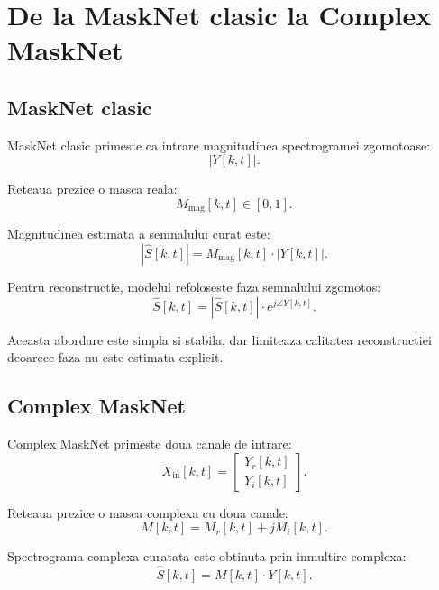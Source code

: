 \documentclass[12pt,a4paper]{article}
\begin{document}
\section{De la MaskNet clasic la Complex MaskNet}

\subsection{MaskNet clasic}

MaskNet clasic primeste ca intrare magnitudinea spectrogramei zgomotoase:
\begin{equation}
    |Y[k,t]|.
\end{equation}

Reteaua prezice o masca reala:
\begin{equation}
    M_{\mathrm{mag}}[k,t] \in [0,1].
\end{equation}

Magnitudinea estimata a semnalului curat este:
\begin{equation}
    |\hat{S}[k,t]| = M_{\mathrm{mag}}[k,t] \cdot |Y[k,t]|.
\end{equation}

Pentru reconstructie, modelul refoloseste faza semnalului zgomotos:
\begin{equation}
    \hat{S}[k,t] =
    |\hat{S}[k,t]| \cdot e^{j \angle Y[k,t]}.
\end{equation}

Aceasta abordare este simpla si stabila, dar limiteaza calitatea reconstructiei
deoarece faza nu este estimata explicit.

\subsection{Complex MaskNet}

Complex MaskNet primeste doua canale de intrare:
\begin{equation}
    X_{\mathrm{in}}[k,t] =
    \begin{bmatrix}
        Y_r[k,t] \\
        Y_i[k,t]
    \end{bmatrix}.
\end{equation}

Reteaua prezice o masca complexa cu doua canale:
\begin{equation}
    M[k,t] = M_r[k,t] + jM_i[k,t].
\end{equation}

Spectrograma complexa curatata este obtinuta prin inmultire complexa:
\begin{equation}
    \hat{S}[k,t] = M[k,t] \cdot Y[k,t].
\end{equation}
\end{document}
